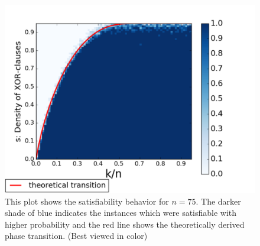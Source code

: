 
\begin{figure}
	\begin{center}
		\includegraphics[width= 1\columnwidth]{pb-experiments/satisfiability/add/75boundary.pdf}
	\end{center}
	\caption{This plot shows the satisfiability behavior for $n=75$. The darker shade of blue indicates the instances which were satisfiable with higher probability and the red line shows the theoretically derived phase transition. (Best viewed in color)} 
	\label{fig:satisfiablitiy}
\end{figure}
